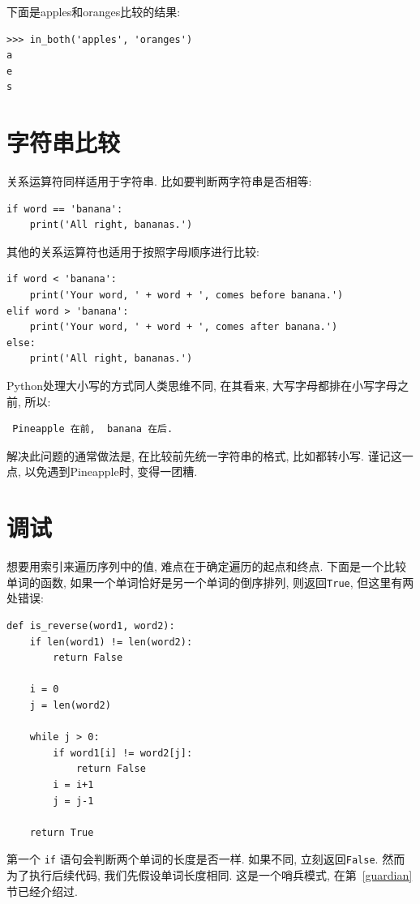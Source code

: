 \documentclass[10pt]{book}
\begin{document}
下面是apples和oranges比较的结果:

\begin{verbatim}
>>> in_both('apples', 'oranges')
a
e
s
\end{verbatim}
%

\section{字符串比较}

关系运算符同样适用于字符串. 
比如要判断两字符串是否相等:

\begin{verbatim}
if word == 'banana':
    print('All right, bananas.')
\end{verbatim}
%

其他的关系运算符也适用于按照字母顺序进行比较:

\begin{verbatim}
if word < 'banana':
    print('Your word, ' + word + ', comes before banana.')
elif word > 'banana':
    print('Your word, ' + word + ', comes after banana.')
else:
    print('All right, bananas.')
\end{verbatim}
%
Python处理大小写的方式同人类思维不同, 在其看来, 大写字母都排在小写字母之前, 
所以:

\begin{verbatim}
 Pineapple 在前,  banana 在后.
\end{verbatim}
%
解决此问题的通常做法是, 在比较前先统一字符串的格式, 比如都转小写. 
谨记这一点, 以免遇到Pineapple时, 变得一团糟. 


\section{调试}

想要用索引来遍历序列中的值, 难点在于确定遍历的起点和终点. 
下面是一个比较单词的函数, 如果一个单词恰好是另一个单词的倒序排列, 
则返回{\tt True}, 但这里有两处错误:

\begin{verbatim}
def is_reverse(word1, word2):
    if len(word1) != len(word2):
        return False
    
    i = 0
    j = len(word2)

    while j > 0:
        if word1[i] != word2[j]:
            return False
        i = i+1
        j = j-1

    return True
\end{verbatim}
%
第一个 {\tt if} 语句会判断两个单词的长度是否一样. 
如果不同, 立刻返回{\tt False}. 
然而为了执行后续代码, 我们先假设单词长度相同. 
这是一个哨兵模式, 在第~\ref{guardian}节已经介绍过. 
\end{document}
